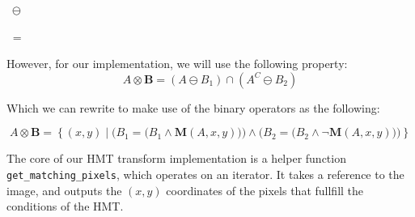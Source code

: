 \documentclass[12pt]{article}
\begin{document}
\begin{center}
    $\; \ominus \; $
    $\; = \; $
\end{center}

However, for our implementation, we will use the following property:
\begin{equation}
    A \otimes \mathbf{B} = (A \ominus B_1) \cap (A^C \ominus B_2)
\end{equation}

Which we can rewrite to make use of the binary operators as the following:

\begin{equation}
    A \otimes \mathbf{B} = \left\{ (x,y) \mid
    \Big(B_1 = \big(B_1 \land \mathbf{M}(A,x,y)\big)\Big)
    \land \Big( B_2 = \big( B_2 \land \neg \mathbf{M}(A,x,y) \big) \Big)
    \right\}
\end{equation}

The core of our HMT transform implementation is a helper function \lstinline{get_matching_pixels}, which operates on an iterator.
It takes a reference to the image, and outputs the $(x,y)$ coordinates of the pixels that fullfill the conditions of the HMT.
\end{document}
